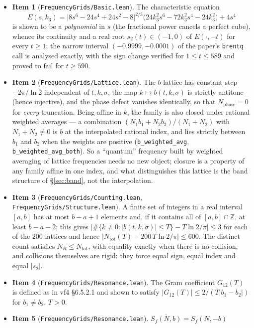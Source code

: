 \documentclass[11pt,a4paper]{article}
\newcommand{\Z}{\mathbb{Z}}
\newcommand{\lb}{\_\allowbreak}
\newcommand{\code}[1]{\texttt{#1}}
\newcommand{\itemization}[1]{\begin{itemize}[leftmargin=1.4em,itemsep=1pt,topsep=2pt]#1\end{itemize}}
\theoremstyle{definition}
\theoremstyle{remark}
\begin{document}
\itemization{
\item \textbf{Item 1} (\code{FrequencyGrids/Basic.lean}). The characteristic equation
  \[
    E(s,k_3)=\bigl|8s^6-24s^4+24s^2-8\bigr|^{2/3}\bigl(24k_3^2s^6-72k_3^2s^4-24k_3^2\bigr)+4s^4
  \]
  is shown to be a \emph{polynomial} in $s$ (the fractional power cancels a perfect cube),
  whence its continuity and a real root $s_2(t)\in(-1,0)$ of $E(\cdot,-t)$ for every $t\ge1$;
  the narrow interval $(-0.9999,-0.0001)$ of the paper's \code{brentq} call is analysed
  exactly, with the sign change verified for $1\le t\le589$ and proved to fail for
  $t\ge590$.
\item \textbf{Item 2} (\code{FrequencyGrids/Lattice.lean}). The $b$-lattice has constant step
  $-2\pi/\ln2$ independent of $t,k,\sigma$, the map $k\mapsto b(t,k,\sigma)$ is strictly
  antitone (hence injective), and the phase defect vanishes identically, so that
  $N_{\mathrm{phase}}=0$ for \emph{every} truncation.  Being affine in $k$, the family is also
  closed under rational weighted averages --- a combination
  $(N_1b_1+N_2b_2)/(N_1+N_2)$ with $N_1+N_2\neq0$ is $b$ at the interpolated rational index,
  and lies strictly between $b_1$ and $b_2$ when the weights are positive
  (\code{b\lb weighted\lb avg}, \code{b\lb weighted\lb avg\lb both}).  So a
  ``quantum'' frequency built by weighted averaging of lattice frequencies needs no new
  object; closure is a property of any family affine in one index, and what distinguishes
  this lattice is the band structure of \S\ref{sec:band}, not the interpolation.
\item \textbf{Item 3} (\code{FrequencyGrids/Counting.lean},
  \code{FrequencyGrids/Structure.lean}). A finite set of integers in a real interval
  $[a,b]$ has at most $b-a+1$ elements and, if it contains all of $[a,b]\cap\Z$, at least
  $b-a-2$; this gives
  $\bigl|\#\{k\neq0:|b(t,k,\sigma)|\le T\}-T\ln2/\pi\bigr|\le3$ for each of the $200$
  lattices and hence $\bigl|N_{\mathrm{tot}}(T)-200\,T\ln2/\pi\bigr|\le600$.  The distinct
  count satisfies $N_R\le N_{\mathrm{tot}}$, with equality exactly when there is no
  collision, and collisions themselves are rigid: they force equal sign, equal index and
  equal $|s_2|$.
\item \textbf{Item 4} (\code{FrequencyGrids/Resonance.lean}). The Gram coefficient
  $G_{12}(T)$ is defined as in vf4 \S6.5.2.1 and shown to satisfy
  $|G_{12}(T)|\le2/(T|b_1-b_2|)$ for $b_1\neq b_2$, $T>0$.
\item \textbf{Item 5} (\code{FrequencyGrids/Resonance.lean}). $\overline{S_f(N,b)}=S_f(N,-b)$
}
\end{document}
